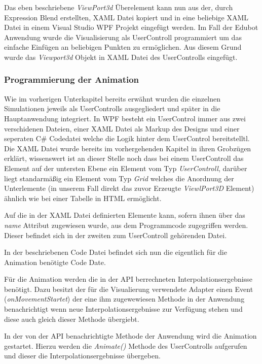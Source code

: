Das eben beschriebene \textit{ViewPort3d} Überelement kann nun aus der, durch Expression Blend erstellten, XAML Datei kopiert und in eine beliebige XAML Datei in einem Visual Studio WPF Projekt eingefügt werden. Im Fall der Edubot Anwendung wurde die Visualisierung als UserControll programmiert um das einfache Einfügen an beliebigen Punkten zu ermöglichen. Aus diesem Grund wurde das \textit{Viewport3d} Objekt in XAML Datei des UserControlls eingefügt.

\subsubsection{Programmierung der Animation}
Wie im vorherigen Unterkapitel bereits erwähnt wurden die einzelnen Simulationen jeweils als UserControlls ausgegliedert und später in die Hauptanwendung integriert. 
In WPF besteht ein UserControl immer aus zwei verschidenen Dateien, einer XAML Datei als Markup des Designs und einer seperaten C\# Codedatei welche die Logik hinter dem UserControl bereitstelltl. Die XAML Datei wurde bereits im vorhergehenden Kapitel in ihren Grobzügen erklärt, wissenswert ist an dieser Stelle noch dass bei einem UserControll das Element auf der untersten Ebene ein Element vom Typ \textit{UserControll}, darüber liegt standarmäßig ein Element vom Typ \textit{Grid} welches die Anordnung der Unterlemente (in unserem Fall direkt das zuvor Erzeugte \textit{ViewlPort3D} Element) ähnlich wie bei einer Tabelle in HTML ermöglicht.

Auf die in der XAML Datei definierten Elemente kann, sofern ihnen über das \textit{name} Attribut zugewiesen wurde, aus dem Programmcode zugegriffen werden. Dieser befindet sich in der zweiten zum UserControll gehörenden Datei.

In der beschriebenen Code Datei befindet sich nun die eigentlich für die Animation benötigte Code Date. 

Für die Animation werden die in der API berrechneten Interpolationsergebnisse benötigt. Dazu besitzt der für die Visualierung verwendete Adapter einen Event (\textit{onMovementStartet}) der eine ihm zugewewiesen Methode in der Anwendung benachrichtigt wenn neue Interpolationsergebnisse zur Verfügung stehen und diese auch gleich dieser Methode übergiebt. 

In der von der API benachrichtigte Methode der Anwendung wird die Animation gestartet. Hierzu werden die \textit{Animate()} Methode des UserControlls aufgerufen und dieser die Interpolationsergebnisse übergeben.

